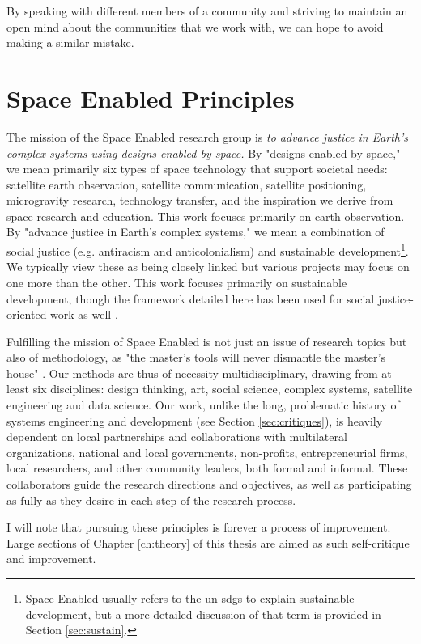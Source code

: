 By speaking with different members of a community and striving to maintain an open mind about the communities that we work with, we can hope to avoid making a similar mistake.

\section{Space Enabled Principles}

The mission of the Space Enabled research group is \textit{to advance justice in Earth's complex systems using designs enabled by space.} By "designs enabled by space," we mean primarily six types of space technology that support societal needs: satellite earth observation, satellite communication, satellite positioning, microgravity research, technology transfer, and the inspiration we derive from space research and education. This work focuses primarily on earth observation. By "advance justice in Earth's complex systems," we mean a combination of social justice (e.g. antiracism and anticolonialism) and sustainable development\footnote{Space Enabled usually refers to the \ac{un} \acp{sdg} to explain sustainable development, but a more detailed discussion of that term is provided in Section \ref{sec:sustain}.}. We typically view these as being closely linked but various projects may focus on one more than the other. This work focuses primarily on sustainable development, though the framework detailed here has been used for social justice-oriented work as well \cite{ovienmhadaEnvironmentVulnerabilityDecisionTechnologyModelingFramework2021}. 

Fulfilling the mission of Space Enabled is not just an issue of research topics but also of methodology, as "the master's tools will never dismantle the master's house" \cite{lordeMasterToolsWill1984}. Our methods are thus of necessity multidisciplinary, drawing from at least six disciplines: design thinking, art, social science, complex systems, satellite engineering and data science. Our work, unlike the long, problematic history of systems engineering and development (see Section \ref{sec:critiques}), is heavily dependent on local partnerships and collaborations with multilateral organizations, national and local governments, non-profits, entrepreneurial firms, local researchers, and other community leaders, both formal and informal. These collaborators guide the research directions and objectives, as well as participating as fully as they desire in each step of the research process.

I will note that pursuing these principles is forever a process of improvement. Large sections of Chapter \ref{ch:theory} of this thesis are aimed as such self-critique and improvement. 

